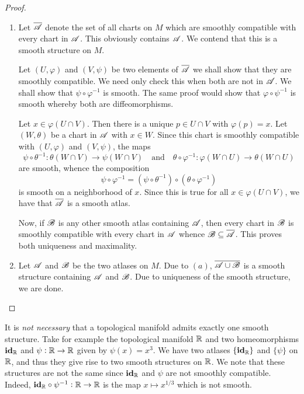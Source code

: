 \begin{proof}
\begin{enumerate}[label=(\alph*)]
    \item Let $\overline{\mathscr A}$ denote the set of all charts on $M$ which are smoothly compatible with every chart in $\mathscr A$. This obviously contains $\mathscr A$. We contend that this is a smooth structure on $M$. 

    Let $(U,\varphi)$ and $(V,\psi)$ be two elements of $\overline{\mathscr A}$ we shall show that they are smoothly compatible. We need only check this when both are not in $\mathscr A$. We shall show that $\psi\circ\varphi^{-1}$ is smooth. The same proof would show that $\varphi\circ\psi^{-1}$ is smooth whereby both are diffeomorphisms.

    Let $x\in\varphi(U\cap V)$. Then there is a unique $p\in U\cap V$ with $\varphi(p) = x$. Let $(W,\theta)$ be a chart in $\mathscr A$ with $x\in W$. Since this chart is smoothly compatible with $(U,\varphi)$ and $(V,\psi)$, the maps 
    \begin{equation*}
        \psi\circ\theta^{-1}:\theta(W\cap V)\to\psi(W\cap V)\quad\text{and}\quad\theta\circ\varphi^{-1}:\varphi(W\cap U)\to\theta(W\cap U)
    \end{equation*}
    are smooth, whence the composition 
    \begin{equation*}
        \psi\circ\varphi^{-1} = (\psi\circ\theta^{-1})\circ(\theta\circ\varphi^{-1})
    \end{equation*}
    is smooth on a neighborhood of $x$. Since this is true for all $x\in\varphi(U\cap V)$, we have that $\overline{\mathscr A}$ is a smooth atlas. 

    Now, if $\mathscr B$ is any other smooth atlas containing $\mathscr A$, then every chart in $\mathscr B$ is smoothly compatible with every chart in $\mathscr A$ whence $\mathscr B\subseteq\overline{\mathscr A}$. This proves both uniqueness and maximality.

    \item Let $\mathscr A$ and $\mathscr B$ be the two atlases on $M$. Due to $(a)$, $\overline{\mathscr A\cup\mathscr B}$ is a smooth structure containing $\mathscr A$ and $\mathscr B$. Due to uniqueness of the smooth structure, we are done.
\end{enumerate}
\end{proof}

\begin{remark}
    It is \emph{not necessary} that a topological manifold admits exactly one smooth structure. Take for example the topological manifold $\mathbb{R}$ and two homeomorphisms $\mathbf{id}_{\mathbb{R}}$ and $\psi:\mathbb{R}\to\mathbb{R}$ given by $\psi(x) = x^3$. We have two atlases $\{\mathbf{id}_{\mathbb{R}}\}$ and $\{\psi\}$ on $\mathbb{R}$, and thus they give rise to two smooth structures on $\mathbb{R}$. We note that these structures are not the same since $\mathbf{id}_{\mathbb{R}}$ and $\psi$ are not smoothly compatible. Indeed, $\mathbf{id}_{\mathbb{R}}\circ\psi^{-1}:\mathbb{R}\to\mathbb{R}$ is the map $x\mapsto x^{1/3}$ which is not smooth.
\end{remark}

